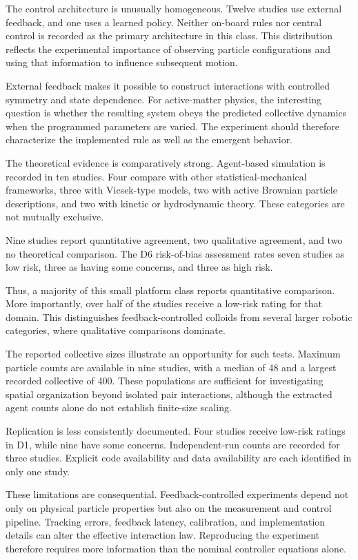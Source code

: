 The control architecture is unusually homogeneous.
Twelve studies use external feedback, and one
uses a learned policy. Neither on-board rules
nor central control is recorded as the primary
architecture in this class. This distribution
reflects the experimental importance of observing
particle configurations and using that information
to influence subsequent motion.

External feedback makes it possible to construct
interactions with controlled symmetry and state
dependence. For active-matter physics, the
interesting question is whether the resulting
system obeys the predicted collective dynamics
when the programmed parameters are varied.
The experiment should therefore characterize
the implemented rule as well as the emergent
behavior.

The theoretical evidence is comparatively strong.
Agent-based simulation is recorded in ten studies.
Four compare with other statistical-mechanical
frameworks, three with Vicsek-type models,
two with active Brownian particle descriptions,
and two with kinetic or hydrodynamic theory.
These categories are not mutually exclusive.

Nine studies report quantitative agreement,
two qualitative agreement, and two no
theoretical comparison. The D6 risk-of-bias
assessment rates seven studies as low risk,
three as having some concerns, and three
as high risk.

Thus, a majority of this small platform class
reports quantitative comparison. More importantly,
over half of the studies receive a low-risk
rating for that domain. This distinguishes
feedback-controlled colloids from several
larger robotic categories, where qualitative
comparisons dominate.

The reported collective sizes illustrate
an opportunity for such tests. Maximum
particle counts are available in nine
studies, with a median of 48 and
a largest recorded collective of 400.
These populations are sufficient for
investigating spatial organization
beyond isolated pair interactions,
although the extracted agent counts
alone do not establish finite-size
scaling.

Replication is less consistently documented.
Four studies receive low-risk ratings
in D1, while nine have some concerns.
Independent-run counts are recorded for
three studies. Explicit code availability
and data availability are each identified
in only one study.

These limitations are consequential.
Feedback-controlled experiments depend
not only on physical particle properties
but also on the measurement and control
pipeline. Tracking errors, feedback
latency, calibration, and implementation
details can alter the effective
interaction law. Reproducing the
experiment therefore requires more
information than the nominal controller
equations alone.

